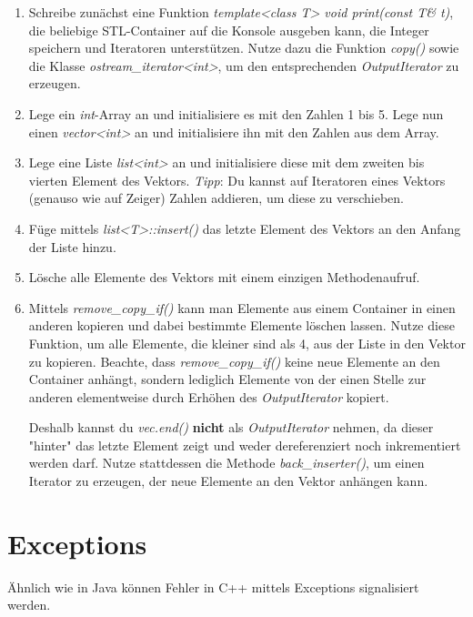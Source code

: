 \documentclass[
  accentcolor=tud1c,	%
  colorbacktitle,		%
  inverttitle,			%
  german,				%
  twoside
]{tudexercise}
\begin{document}
\begin{enumerate}
\item 
Schreibe zunächst eine Funktion \emph{template<class T> void print(const T\& t)}, die beliebige STL-Container auf die Konsole ausgeben kann, die Integer speichern und Iteratoren unterstützen.
Nutze dazu die Funktion \emph{copy()} sowie die Klasse \emph{ostream\_iterator<int>}, um den entsprechenden \emph{OutputIterator} zu erzeugen.

\item
Lege ein \emph{int}-Array an und initialisiere es mit den Zahlen 1 bis 5.
Lege nun einen \emph{vector<int>} an und initialisiere ihn mit den Zahlen aus dem Array.

\item
Lege eine Liste \emph{list<int>} an und initialisiere diese mit dem zweiten bis vierten Element des Vektors.
\emph{Tipp}: Du kannst auf Iteratoren eines Vektors (genauso wie auf Zeiger) Zahlen addieren, um diese zu verschieben.

\item
Füge mittels \emph{list<T>::insert()} das letzte Element des Vektors an den Anfang der Liste hinzu.

\item
Lösche alle Elemente des Vektors mit einem einzigen Methodenaufruf.

\item
Mittels \emph{remove\_copy\_if()} kann man Elemente aus einem Container in einen anderen kopieren und dabei bestimmte Elemente löschen lassen.
Nutze diese Funktion, um alle Elemente, die kleiner sind als 4, aus der Liste in den Vektor zu kopieren. Beachte, dass \emph{remove\_copy\_if()} keine neue Elemente an den Container anhängt, sondern lediglich Elemente von der einen Stelle zur anderen elementweise durch Erhöhen des \emph{OutputIterator} kopiert.

Deshalb kannst du \emph{vec.end()} \textbf{nicht} als \emph{OutputIterator} nehmen, da dieser "{}hinter"{} das letzte Element zeigt und weder dereferenziert noch inkrementiert werden darf. Nutze stattdessen die Methode \emph{back\_inserter()}, um einen Iterator zu erzeugen, der neue Elemente an den Vektor anhängen kann.
\end{enumerate}

\section{Exceptions}
Ähnlich wie in Java können Fehler in C++ mittels Exceptions signalisiert werden.
\end{document}
